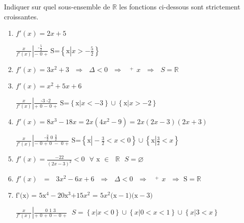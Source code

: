 \begin{solution}
Indiquer sur quel sous-ensemble de $\mathbb{R}$ les fonctions ci-dessous sont strictement croissantes. 
\begin{enumerate}
\item ${f}'\left( x \right)=2x+5$

$\left. \frac{x}{f'(x)} \right|\frac{\text{              -}\frac{\text{5}}{\text{2}}\text{               }}{-\text{        0        +}}\text{              S=}\left\{ \left. \text{x} \right|x>-\frac{5}{2} \right\}$

\item ${f}'\left( x \right)=3{{x}^{2}}+3\text{ }\Rightarrow \text{ }\Delta <0\text{ }\Rightarrow \text{ }\overset{+}{\mathop{\overline{\to }}}\,x\text{ }\Rightarrow \text{ }S=\mathbb{R}$

\item ${f}'\left( x \right)={{x}^{2}}+5x+6$

$\left. \frac{x}{f'(x)} \right|\frac{\text{              -3                -2               }}{\text{+         0    }-\text{          0         +}}\text{               S=}\left\{ \left. \text{x} \right|x<-3 \right\}\cup \left\{ \left. \text{x} \right|x>-2 \right\}$

\item ${f}'\left( x \right)=8{{x}^{3}}-18x=2x(4{{x}^{2}}-9)=2x(2x-3)(2x+3)$

$\left. \frac{x}{f'(x)} \right|\frac{\text{               -}\frac{\text{3}}{\text{2}}\text{            0               }\frac{\text{3}}{\text{2}}\text{               }}{-\text{          0    +       0    }-\text{        0         +}}\text{               S=}\left\{ \left. \text{x} \right|-\frac{3}{2}<x<0 \right\}\cup \left\{ \left. \text{x} \right|\frac{3}{2}<x \right\}$

\item ${f}'(x)=\frac{-22}{{{\left( 2x-3 \right)}^{2}}}<0\text{   }\forall \text{ x }\in \text{ }\mathbb{R}\text{             }S=\varnothing $

\item ${f}'(x)\text{ }=\text{ }3{{x}^{2}}-6x+6\text{ }\Rightarrow \text{ }\Delta <0\text{ }\Rightarrow \text{ }\overset{+}{\mathop{\overline{\to }}}\,x\text{ }\Rightarrow \text{ S}=\mathbb{R}\text{              }$

\item $\text{{f}'(x) = 5}{{\text{x}}^{\text{4}}}-\text{20}{{\text{x}}^{\text{3}}}\text{+15}{{x}^{2}}\text{ = 5}{{x}^{2}}\text{(x}-\text{1)(x}-\text{3)}$

$\left. \frac{x}{f'(x)} \right|\frac{\text{            0            1              3               }}{\text{+     0    +      0    }-\text{      0         +}}\text{               }S=\left\{ \left. x \right|x<0 \right\}\cup \left\{ \left. x \right|0<x<1 \right\}\cup \left\{ \left. x \right|3<x \right\}$ 
\end{enumerate}
\end{solution}

